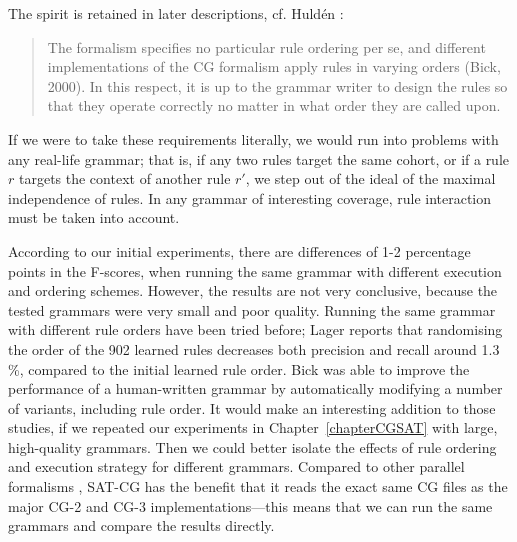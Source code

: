 \noindent The spirit is retained in later descriptions, cf. Huldén \cite{hulden2011cg_engine}:

\begin{quote} 
The formalism specifies no particular rule ordering per se, and different implementations of the CG formalism apply rules in varying orders (Bick, 2000).  In this respect, it is up to the grammar writer to design the rules so that they operate correctly no matter in what order they are called upon. 
\end{quote}

\noindent If we were to take these requirements literally, we would run into problems with any real-life grammar; that is, if any two rules target the same cohort, or if a rule $r$ targets the context of another rule $r'$, we step out of the ideal of the maximal independence of rules.
In any grammar of interesting coverage, rule interaction must be taken into account.

According to our initial experiments, there are differences of 1-2 percentage points in the F-scores, when running the same grammar with different execution and ordering schemes. However, the results are not very conclusive, because the tested grammars were very small and poor quality.
Running the same grammar with different rule orders have been tried before; Lager \cite{lager01transformation} reports that randomising the order of the 902 learned rules 
decreases both precision and recall around 1.3 \%, compared to the initial learned rule order. %
Bick \cite{bick2013tuning} was able to improve the performance of a human-written grammar by automatically modifying a number of variants, including rule order.
It would make an interesting addition to those studies, if we repeated our experiments in Chapter~\ref{chapterCGSAT} with large, high-quality grammars.
Then we could better isolate the effects of rule ordering and execution strategy for different grammars.
Compared to other parallel formalisms \cite{koskenniemi90,voutilainen1994designing,oflazer97votingconstraints,lager98}, SAT-CG has the benefit that it reads the exact same CG files as the major CG-2 and CG-3 implementations---this means that we can run the same grammars and compare the results directly. 




